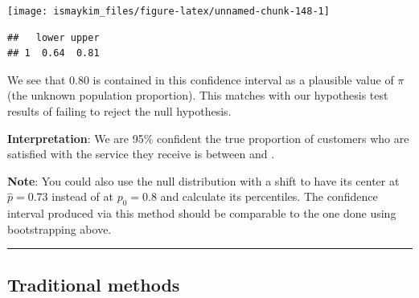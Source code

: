 \documentclass[]{tufte-book}
\newenvironment{Shaded}{\begin{snugshade}}{\end{snugshade}}
\newcommand{\KeywordTok}[1]{\textcolor[rgb]{0.13,0.29,0.53}{\textbf{{#1}}}}
\newcommand{\DataTypeTok}[1]{\textcolor[rgb]{0.13,0.29,0.53}{{#1}}}
\newcommand{\DecValTok}[1]{\textcolor[rgb]{0.00,0.00,0.81}{{#1}}}
\newcommand{\FloatTok}[1]{\textcolor[rgb]{0.00,0.00,0.81}{{#1}}}
\newcommand{\StringTok}[1]{\textcolor[rgb]{0.31,0.60,0.02}{{#1}}}
\newcommand{\NormalTok}[1]{{#1}}
\let\oldrule=\rule
\renewcommand{\rule}[1]{\oldrule{\linewidth}}
\begin{document}
\begin{Shaded}
\end{Shaded}

\begin{center}\texttt{[image: ismaykim\_files/figure-latex/unnamed-chunk-148-1]} \end{center}

\begin{Shaded}
\end{Shaded}

\begin{verbatim}
##   lower upper
## 1  0.64  0.81
\end{verbatim}

We see that 0.80 is contained in this confidence interval as a plausible
value of \(\pi\) (the unknown population proportion). This matches with
our hypothesis test results of failing to reject the null hypothesis.

\textbf{Interpretation}: We are 95\% confident the true proportion of
customers who are satisfied with the service they receive is between and
.

\textbf{Note}: You could also use the null distribution with a shift to
have its center at \(\hat{p} = 0.73\) instead of at \(p_0 = 0.8\) and
calculate its percentiles. The confidence interval produced via this
method should be comparable to the one done using bootstrapping above.

\begin{center}\rule{0.5\linewidth}{\linethickness}\end{center}

\subsection{Traditional methods}\label{traditional-methods-1}
\end{document}
